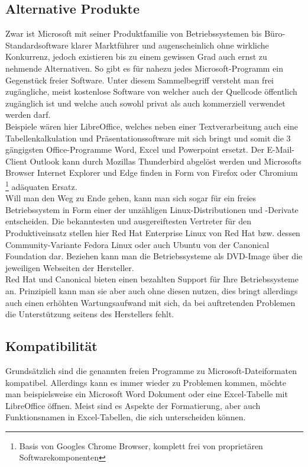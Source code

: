 \subsection{Alternative Produkte}
Zwar ist Microsoft mit seiner Produktfamilie von Betriebssystemen bis Büro-Standardsoftware klarer Marktführer und augenscheinlich ohne wirkliche Konkurrenz, jedoch existieren bis zu einem gewissen Grad auch ernst zu nehmende Alternativen. So gibt es für nahezu jedes Microsoft-Programm ein Gegenstück freier Software. Unter diesem Sammelbegriff versteht man frei zugängliche, meist kostenlose Software von welcher auch der Quellcode öffentlich zugänglich ist und welche auch sowohl privat als auch kommerziell verwendet werden darf.\\
Beispiele wären hier \glqq LibreOffice\grqq{}, welches neben einer Textverarbeitung auch eine Tabellenkalkulation und Präsentationssoftware mit sich bringt und somit die 3 gängigsten Office-Programme \glqq Word\grqq{}, \glqq Excel\grqq{} und \glqq Powerpoint\grqq{} ersetzt. Der E-Mail-Client \glqq Outlook\grqq{} kann durch Mozillas \glqq Thunderbird\grqq{} abgelöst werden und Microsofts Browser \glqq Internet Explorer\grqq{} und \glqq Edge\grqq{} finden in Form von \glqq Firefox\grqq{} oder \glqq Chromium\grqq{} \footnote{Basis von Googles Chrome Browser, komplett frei von proprietären Softwarekomponenten} adäquaten Ersatz.\\
Will man den Weg zu Ende gehen, kann man sich sogar für ein freies Betriebssystem in Form einer der unzähligen Linux-Distributionen und -Derivate entscheiden. Die bekanntesten und ausgereiftesten Vertreter für den Produktiveinsatz stellen hier \glqq Red Hat Enterprise Linux\grqq{} von Red Hat bzw. dessen Community-Variante \glqq Fedora Linux\grqq{} oder auch \glqq Ubuntu\grqq{} von der Canonical Foundation dar. Beziehen kann man die Betriebssysteme als DVD-Image über die jeweiligen Webseiten der Hersteller.\\
Red Hat und Canonical bieten einen bezahlten Support für Ihre Betriebssysteme an. Prinzipiell kann man sie aber auch ohne diesen nutzen, dies bringt allerdings auch einen erhöhten Wartungsaufwand mit sich, da bei auftretenden Problemen die Unterstützung seitens des Herstellers fehlt.

\subsection{Kompatibilität}
Grundsätzlich sind die genannten freien Programme zu Microsoft-Dateiformaten kompatibel. Allerdings kann es immer wieder zu Problemen kommen, möchte man beispielsweise ein Microsoft Word Dokument oder eine Excel-Tabelle mit LibreOffice öffnen. Meist sind es Aspekte der Formatierung, aber auch Funktionsnamen in Excel-Tabellen, die sich unterscheiden können.

